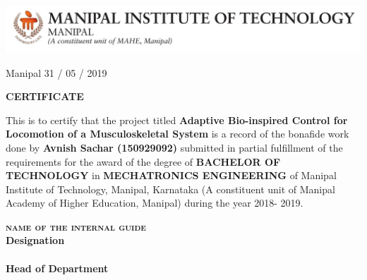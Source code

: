 \begin{titlepage}
\thispagestyle{empty}
    \begin{center}
        {\includegraphics[height=0.09\textheight, width=1\textwidth]{Figures/mit.jpg}}
    \end{center}
    \begin{flushright}
        \vspace{0.1cm}
        Manipal
        \linebreak
        \vspace{0.5cm}
        31 / 05 / 2019
    \end{flushright} 
    \begin{center}
    \Large{\textbf{\textsc{CERTIFICATE}}}
    \linebreak
    \end{center}
    This is to certify that the project titled \textbf{Adaptive Bio-inspired Control for Locomotion of a Musculoskeletal System} is a record of the bonafide
    work done by \textbf{Avnish Sachar (150929092)} submitted in partial fulfillment of the
    requirements for the award of the degree of \textbf{BACHELOR OF TECHNOLOGY} in
    \textbf{MECHATRONICS ENGINEERING} of Manipal Institute of Technology, Manipal, Karnataka
    (A constituent unit of Manipal Academy of Higher Education, Manipal) during the year 2018-
    2019.
    
    \vspace{7cm}
    \begin{center}
    \begin{multicols}{2}
        \textbf{\textsc{\normalsize{name of the internal guide}}\\
        \footnotesize{Designation}\\
        }
        \columnbreak
        \textbf{\footnotesize{}\\
        \textbf{\footnotesize{Head of Department}}
        }
    \end{multicols}
    \end{center}
\end{titlepage}